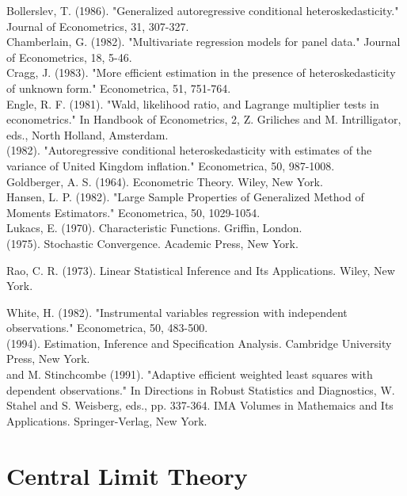 \documentclass[10pt]{article}
\begin{document}
Bollerslev, T. (1986). "Generalized autoregressive conditional heteroskedasticity." Journal of Econometrics, 31, 307-327.\\
Chamberlain, G. (1982). "Multivariate regression models for panel data." Journal of Econometrics, 18, 5-46.\\
Cragg, J. (1983). "More efficient estimation in the presence of heteroskedasticity of unknown form." Econometrica, 51, 751-764.\\
Engle, R. F. (1981). "Wald, likelihood ratio, and Lagrange multiplier tests in econometrics." In Handbook of Econometrics, 2, Z. Griliches and M. Intrilligator, eds., North Holland, Amsterdam.\\
(1982). "Autoregressive conditional heteroskedasticity with estimates of the variance of United Kingdom inflation." Econometrica, 50, 987-1008.\\
Goldberger, A. S. (1964). Econometric Theory. Wiley, New York.\\
Hansen, L. P. (1982). "Large Sample Properties of Generalized Method of Moments Estimators." Econometrica, 50, 1029-1054.\\
Lukacs, E. (1970). Characteristic Functions. Griffin, London.\\
(1975). Stochastic Convergence. Academic Press, New York.

Rao, C. R. (1973). Linear Statistical Inference and Its Applications. Wiley, New York.

White, H. (1982). "Instrumental variables regression with independent observations." Econometrica, 50, 483-500.\\
(1994). Estimation, Inference and Specification Analysis. Cambridge University Press, New York.\\
and M. Stinchcombe (1991). "Adaptive efficient weighted least squares with dependent observations." In Directions in Robust Statistics and Diagnostics, W. Stahel and S. Weisberg, eds., pp. 337-364. IMA Volumes in Mathemaics and Its Applications. Springer-Verlag, New York.

\section*{Central Limit Theory}
\end{document}

